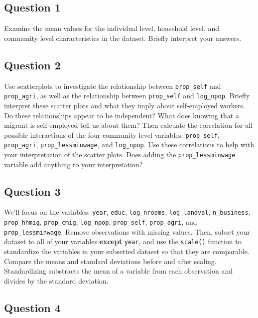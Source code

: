 \documentclass[]{article}
\begin{document}
\subsection{Question 1}\label{question-1}

Examine the mean values for the individual level, household level, and
community level characteristics in the dataset. Briefly interpret your
answers.

\subsection{Question 2}\label{question-2}

Use scatterplots to investigate the relationship between
\texttt{prop\_self} and \texttt{prop\_agri}, as well as the relationship
between \texttt{prop\_self} and \texttt{log\_npop}. Briefly interpret
these scatter plots and what they imply about self-employed workers. Do
these relationships appear to be independent? What does knowing that a
migrant is self-employed tell us about them? Then calcuate the
correlation for all possible interactions of the four community level
variables: \texttt{prop\_self}, \texttt{prop\_agri},
\texttt{prop\_lessminwage}, and \texttt{log\_npop}. Use these
correlations to help with your interpretation of the scatter plots. Does
adding the \texttt{prop\_lessminwage} variable add anything to your
interpretation?

\subsection{Question 3}\label{question-3}

We'll focus on the variables: \texttt{year}, \texttt{educ},
\texttt{log\_nrooms}, \texttt{log\_landval}, \texttt{n\_business},
\texttt{prop\_hhmig}, \texttt{prop\_cmig}, \texttt{log\_npop},
\texttt{prop\_self}, \texttt{prop\_agri}, and
\texttt{prop\_lessminwage}. Remove observations with missing values.
Then, subset your dataset to all of your variables \textbf{except}
\texttt{year}, and use the \texttt{scale()} function to standardize the
variables in your subsetted dataset so that they are comparable. Compare
the means and standard deviations before and after scaling.
Standardizing substracts the mean of a variable from each observation
and divides by the standard deviation.

\subsection{Question 4}\label{question-4}
\end{document}
